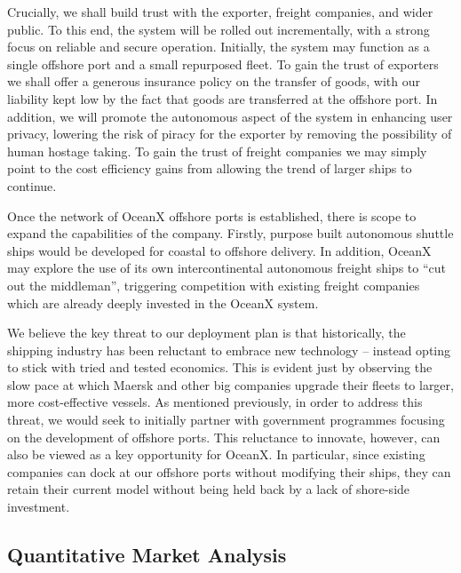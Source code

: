Crucially, we shall build trust with the exporter, freight companies, and wider public. To this end, the system will be rolled out incrementally, with a strong focus on reliable and secure operation. Initially, the system may function as a single offshore port and a small repurposed fleet. To gain the trust of exporters we shall offer a generous insurance policy on the transfer of goods, with our liability kept low by the fact that goods are transferred at the offshore port. In addition, we will promote the autonomous aspect of the system in enhancing user privacy, lowering the risk of piracy for the exporter by removing the possibility of human hostage taking. To gain the trust of freight companies we may simply point to the cost efficiency gains from allowing the trend of larger ships to continue.

Once the network of OceanX offshore ports is established, there is scope to expand the capabilities of the company. Firstly, purpose built autonomous shuttle ships would be developed for coastal to offshore delivery. In addition, OceanX may explore the use of its own intercontinental autonomous freight ships to “cut out the middleman”, triggering competition with existing freight companies which are already deeply invested in the OceanX system.

We believe the key threat to our deployment plan is that historically, the shipping industry has been reluctant to embrace new technology -- instead opting to stick with tried and tested economics. This is evident just by observing the slow pace at which Maersk and other big companies upgrade their fleets to larger, more cost-effective vessels. As mentioned previously, in order to address this threat, we would seek to initially partner with government programmes focusing on the development of offshore ports. This reluctance to innovate, however, can also be viewed as a key opportunity for OceanX. In particular, since existing companies can dock at our offshore ports without modifying their ships, they can retain their current model without being held back by a lack of shore-side investment.


\subsection{Quantitative Market Analysis}

